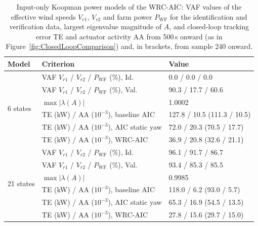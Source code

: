 \begin{table}[htbp]
    \centering
    \caption[Input-only Koopman power models of the WRC-AIC]{Input-only Koopman power models of the WRC-AIC: VAF values of the effective wind speeds $V_{r1}$, $V_{r2}$ and farm power $P_{\text{WF}}$ for the identification and verification data, largest eigenvalue magnitude of $A$, and closed-loop tracking error TE and actuator activity AA from 500\,s onward (as in Figure~\ref{fig:ClosedLoopComparison}) and, in brackets, from sample 240 onward.}
    \label{tab:WRCModelComparison}
    \begin{tabular}{p{3.2cm} l l}
        \toprule
        Model & Criterion & Value \\
        \midrule
        \multirow{6}{=}{6 states}
        & VAF $V_{r1}$ / $V_{r2}$ / $P_{\text{WF}}$ (\%), Id.  & 0.0 / 0.0 / 0.0 \\
        & VAF $V_{r1}$ / $V_{r2}$ / $P_{\text{WF}}$ (\%), Val. & 90.3 / 17.7 / 60.6 \\
        & $\max|\lambda(A)|$                                   & 1.0002 \\
        & TE (kW) / AA ($10^{-3}$), baseline AIC               & 127.8 / 10.5 \; (111.3 / 10.5) \\
        & TE (kW) / AA ($10^{-3}$), AIC static yaw            & 72.0 / 20.3 \; (70.5 / 17.7) \\
        & TE (kW) / AA ($10^{-3}$), WRC-AIC                   & 36.9 / 20.8 \; (32.6 / 21.1) \\
        \midrule
        \multirow{6}{=}{21 states}
        & VAF $V_{r1}$ / $V_{r2}$ / $P_{\text{WF}}$ (\%), Id.  & 96.1 / 91.7 / 86.7 \\
        & VAF $V_{r1}$ / $V_{r2}$ / $P_{\text{WF}}$ (\%), Val. & 93.4 / 85.3 / 85.5 \\
        & $\max|\lambda(A)|$                                   & 0.9985 \\
        & TE (kW) / AA ($10^{-3}$), baseline AIC               & 118.0 / 6.2 \; (93.0 / 5.7) \\
        & TE (kW) / AA ($10^{-3}$), AIC static yaw            & 65.3 / 16.9 \; (54.5 / 13.5) \\
        & TE (kW) / AA ($10^{-3}$), WRC-AIC                   & 27.8 / 15.6 \; (29.7 / 15.0) \\
        \bottomrule
    \end{tabular}
\end{table}

